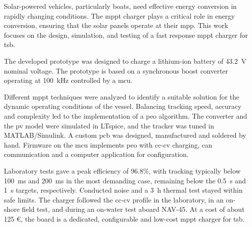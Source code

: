 

\noindent Solar-powered vehicles, particularly boats, need effective energy conversion in rapidly changing conditions. The \ac{mppt} charger plays a critical role in energy conversion, ensuring that the solar panels operate at their \ac{mpp}. This work focuses on the design, simulation, and testing of a fast response \ac{mppt} charger for \ac{tsb}.

The developed prototype was designed to charge a lithium-ion battery of 43.2~V nominal voltage. The prototype is based on a synchronous boost converter operating at 100~kHz controlled by a \ac{mcu}. 

Different \ac{mppt} techniques were analyzed to identify a suitable solution for the dynamic operating conditions of the vessel. Balancing tracking speed, accuracy and complexity led to the implementation of a \ac{peo} algorithm. The converter and the \ac{pv} model were simulated in LTspice, and the tracker was tuned in MATLAB/Simulink. A custom \ac{pcb} was designed, manufactured and soldered by hand. Firmware on the \ac{mcu} implements \ac{peo} with \acs{cc}-\acs{cv} charging, \ac{can} communication and a computer application for configuration.

Laboratory tests gave a peak efficiency of 96.8\%, with tracking typically below 100~ms and 200~ms in the most demanding case, remaining below the 0.5~s and 1~s targets, respectively. Conducted noise and a 3~h thermal test stayed within safe limits. The charger followed the \acs{cc}-\acs{cv} profile in the laboratory, in an on-shore field test, and during an on-water test aboard NAV-45. At a cost of about 125 €, the board is a dedicated, configurable and low-cost \ac{mppt} charger for \ac{tsb}.

\vspace{0.5cm}